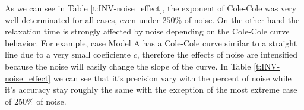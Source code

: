 \documentclass{vie16}
\begin{document}
As we can see in Table \ref{t:INV-noise_effect}, the exponent of
Cole-Cole was very well determinated for all cases, even under $250\%$
of noise.  %
On the other hand the relaxation time is strongly affected by noise
depending on the Cole-Cole curve behavior. For example, case Model A
has a Cole-Cole curve similar to a straight line due to a very small
coeficiente $c$, therefore the effects of noise are intensified
because the noise will easily change the slope of the curve. In
Table \ref{t:INV-noise_effect} we can see that it's precision vary
with the percent of noise while it's accuracy stay roughly the same
with the exception of the most extreme case of $250\%$ of noise.
\end{document}
